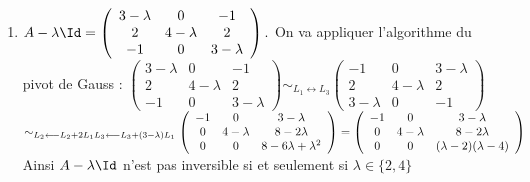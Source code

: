 \begin{correction}
\begin{enumerate}
\item $A-\lambda \Id= \left(\begin{array}{ccc}
3-\lambda&0&-1\\
2&4-\lambda&2\\
-1&0&3-\lambda
\end{array}
\right).$
On va appliquer l'algorithme du pivot de Gauss : 
$\left(\begin{array}{ccc}
3-\lambda&0&-1\\
2&4-\lambda&2\\
-1&0&3-\lambda
\end{array}
\right) \sim_{L_1\longleftrightarrow L_3} \left(\begin{array}{ccc}
-1&0&3-\lambda\\
2&4-\lambda&2\\
3-\lambda&0&-1
\end{array}
\right) $\\
$\sim_{L_2\longleftarrow L_2+2L_1\\ L_3\longleftarrow L_3+(3-\lambda) L_1} \left(\begin{array}{ccc}
-1&0&3-\lambda\\
0&4-\lambda&8-2\lambda \\
0&0&8-6\lambda +\lambda^2
\end{array}
\right)  =\left(\begin{array}{ccc}
-1&0&3-\lambda\\
0&4-\lambda&8-2\lambda \\
0&0&(\lambda -2) (\lambda-4)
\end{array}
\right) $
Ainsi $A-\lambda\Id$ n'est pas inversible si et seulement si $\lambda \in \{2,4\}$


\end{enumerate}
\end{correction}
